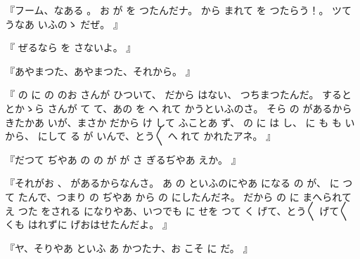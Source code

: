 『フーム、なある
。
お
が
を
つたんだナ。
から
まれて
を
つたらう！。
ツて
うなあ
いふのゝ
だぜ。
』

『
ぜるなら
を
さないよ。
』

『あやまつた、あやまつた、それから。
』

『
の
に
の
のお
さんが
ひついて、
だから
はない、
つちまつたんだ。
すると
とかゝら
さんが
て
て、あの
を
へ
れて
かうといふのさ。
そら
の
があるから
きたかあ
いが、まさか
だから
け
して
ふことあ
ず、
の
に
は
し、
に
も
も
いから、
にして
る
が
いんで、とう〳〵
へ
れて
かれたアネ。
』

『だつて
ぢやあ
の
の
が
が
さ
ぎるぢやあ
えか。
』

『それがお
、
があるからなんさ。
あ
の
といふのにやあ
になる
の
が、
に
つて
たんで、つまり
の
ぢやあ
から
の
にしたんだネ。
だから
の
に
まへられて
え
つた
をされる
になりやあ、いつでも
に
せを
つて
く
げて、とう〳〵
げて〳〵
くも
はれずに
げおはせたんだよ。
』

『ヤ、そりやあ
といふ
あ
かつたナ、お
こそ
に
だ。
』

